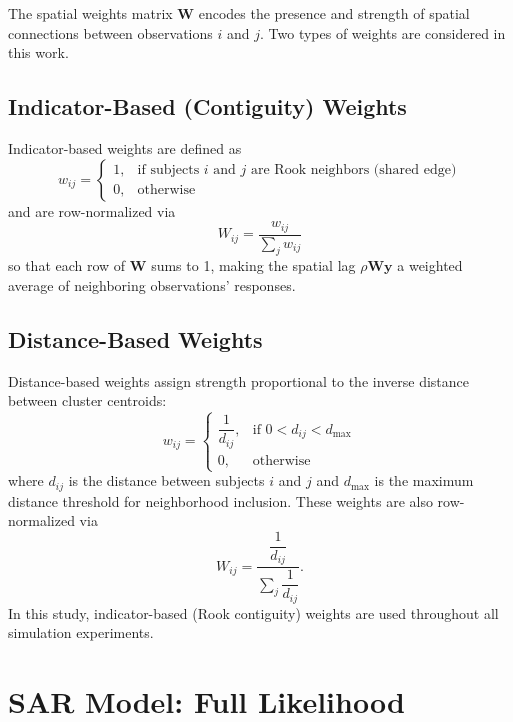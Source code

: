 \documentclass{article}[11pt]
\begin{document}
The spatial weights matrix $\mathbf{W}$ encodes the presence and strength of spatial connections between observations $i$ and $j$. Two types of weights are considered in this work.

\subsection*{Indicator-Based (Contiguity) Weights}

Indicator-based weights are defined as
\begin{equation}
    w_{ij} =
    \begin{cases}
        1, & \text{if subjects $i$ and $j$ are Rook neighbors (shared edge)}\\
        0, & \text{otherwise}
    \end{cases}
\end{equation}
and are row-normalized via
\begin{equation}
    W_{ij} = \frac{w_{ij}}{\displaystyle\sum_{j} w_{ij}}
\end{equation}
so that each row of $\mathbf{W}$ sums to 1, making the spatial lag $\rho\mathbf{Wy}$ a weighted average of neighboring observations' responses.

\subsection*{Distance-Based Weights}

Distance-based weights assign strength proportional to the inverse distance between cluster centroids:
\begin{equation}
    w_{ij} =
    \begin{cases}
        \dfrac{1}{d_{ij}}, & \text{if } 0 < d_{ij} < d_{\max}\\[4pt]
        0, & \text{otherwise}
    \end{cases}
\end{equation}
where $d_{ij}$ is the distance between subjects $i$ and $j$ and $d_{\max}$ is the maximum distance threshold for neighborhood inclusion. These weights are also row-normalized via
\begin{equation}
    W_{ij} = \frac{\dfrac{1}{d_{ij}}}{\displaystyle\sum_{j}\dfrac{1}{d_{ij}}}.
\end{equation}
In this study, indicator-based (Rook contiguity) weights are used throughout all simulation experiments.

\section{SAR Model: Full Likelihood}\label{appendix:SARLikelihood}
\end{document}
